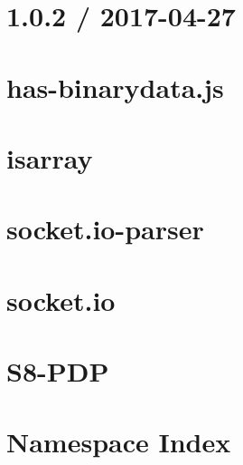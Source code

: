\documentclass[twoside]{book}
\newcommand{\+}{\discretionary{\mbox{\scriptsize$\hookleftarrow$}}{}{}}
\begin{document}
\chapter{1.0.2 / 2017-\/04-\/27}
\label{md_bin_node_modules_socket_8io_node_modules_socket_8io-parser_node_modules_has-binary2__history}

\chapter{has-\/binarydata.js}
\label{md_bin_node_modules_socket_8io_node_modules_socket_8io-parser_node_modules_has-binary2__r_e_a_d_m_e}

\chapter{isarray}
\label{md_bin_node_modules_socket_8io_node_modules_socket_8io-parser_node_modules_isarray__r_e_a_d_m_e}

\chapter{socket.\+io-\/parser}
\label{md_bin_node_modules_socket_8io_node_modules_socket_8io-parser__readme}

\chapter{socket.\+io}
\label{md_bin_node_modules_socket_8io__readme}

\chapter{S8-\/\+P\+DP}
\label{md__r_e_a_d_m_e}

\chapter{Namespace Index}

\end{document}
